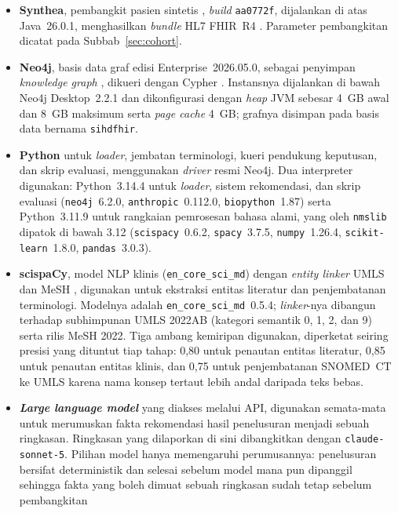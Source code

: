 \begin{itemize}
    \item \textbf{Synthea}, pembangkit pasien sintetis \cite{synthea}, \emph{build}
    \texttt{aa0772f}, dijalankan di atas Java~26.0.1, menghasilkan \emph{bundle} HL7 FHIR~R4
    \cite{fhir_r4}. Parameter pembangkitan dicatat pada
    Subbab~\ref{sec:cohort}.
    \item \textbf{Neo4j}, basis data graf edisi Enterprise~2026.05.0, sebagai penyimpan
    \emph{knowledge graph} \cite{neo4j}, dikueri dengan Cypher \cite{cypher}. Instansnya
    dijalankan di bawah Neo4j Desktop~2.2.1 dan dikonfigurasi dengan \emph{heap} JVM sebesar
    4~GB awal dan 8~GB maksimum serta \emph{page cache} 4~GB; grafnya disimpan pada basis
    data bernama \texttt{sihdfhir}.
    \item \textbf{Python} untuk \emph{loader}, jembatan terminologi, kueri pendukung
    keputusan, dan skrip evaluasi, menggunakan \emph{driver} resmi Neo4j.
    Dua interpreter digunakan: Python~3.14.4 untuk \emph{loader}, sistem rekomendasi, dan
    skrip evaluasi (\texttt{neo4j}~6.2.0, \texttt{anthropic}~0.112.0,
    \texttt{biopython}~1.87) serta Python~3.11.9 untuk rangkaian
    pemrosesan bahasa alami, yang oleh \texttt{nmslib} dipatok di bawah 3.12
    (\texttt{scispacy}~0.6.2, \texttt{spacy}~3.7.5, \texttt{numpy}~1.26.4,
    \texttt{scikit-learn}~1.8.0, \texttt{pandas}~3.0.3).
    \item \textbf{scispaCy}, model NLP klinis (\texttt{en\_core\_sci\_md}) dengan
    \emph{entity linker} UMLS \cite{umls} dan MeSH \cite{scispacy}, digunakan untuk ekstraksi
    entitas literatur dan penjembatanan terminologi.
    Modelnya adalah \texttt{en\_core\_sci\_md}~0.5.4; \emph{linker}-nya dibangun terhadap
    subhimpunan UMLS 2022AB (kategori semantik 0, 1, 2, dan 9) serta rilis MeSH 2022. Tiga
    ambang kemiripan digunakan, diperketat seiring presisi yang dituntut tiap tahap: 0,80
    untuk penautan entitas literatur, 0,85 untuk penautan entitas klinis, dan 0,75 untuk
    penjembatanan SNOMED~CT ke UMLS karena nama konsep tertaut lebih andal daripada teks
    bebas.
    \item \textbf{\emph{Large language model}} yang diakses melalui API, digunakan semata-mata untuk
    merumuskan fakta rekomendasi hasil penelusuran menjadi sebuah ringkasan.
    Ringkasan yang dilaporkan di sini dibangkitkan dengan \texttt{claude-sonnet-5}.
    Pilihan model hanya memengaruhi perumusannya:
    penelusuran bersifat deterministik dan selesai sebelum model mana pun dipanggil
    sehingga fakta yang boleh dimuat sebuah ringkasan sudah tetap sebelum pembangkitan

\end{itemize}
